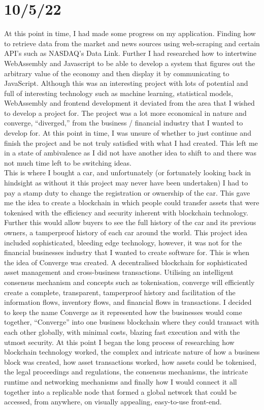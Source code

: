 \section{10/5/22}
At this point in time, I had made some progress on my application. Finding how to retrieve data from the market and news sources using web-scraping and certain API’s such as NASDAQ’s Data Link. Further I had researched how to intertwine WebAssembly and Javascript to be able to develop a system that figures out the arbitrary value of the economy and then display it by communicating to JavaScript. Although this was an interesting project with lots of potential and full of interesting technology such as machine learning, statistical models, WebAssembly and frontend development it deviated from the area that I wished to develop a project for. The project was a lot more economical in nature and converge, “diverged,” from the business / financial industry that I wanted to develop for. At this point in time, I was unsure of whether to just continue and finish the project and be not truly satisfied with what I had created. This left me in a state of ambivalence as I did not have another idea to shift to and there was not much time left to be switching ideas.  \\

This is where I bought a car, and unfortunately (or fortunately looking back in hindsight as without it this project may never have been undertaken) I had to pay a stamp duty to change the registration or ownership of the car. This gave me the idea to create a blockchain in which people could transfer assets that were tokenised with the efficiency and security inherent with blockchain technology. Further this would allow buyers to see the full history of the car and its previous owners, a tamperproof history of each car around the world. This project idea included sophisticated, bleeding edge technology, however, it was not for the financial businesses industry that I wanted to create software for. This is when the idea of Converge was created. A decentralised blockchain for sophisticated asset management and cross-business transactions. Utilising an intelligent consensus mechanism and concepts such as tokenisation, converge will efficiently create a complete, transparent, tamperproof history and facilitation of the information flows, inventory flows, and financial flows in transactions. I decided to keep the name Converge as it represented how the businesses would come together, “Converge” into one business blockchain where they could transact with each other globally, with minimal costs, blazing fast execution and with the utmost security. At this point I began the long process of researching how blockchain technology worked, the complex and intricate nature of how a business block was created, how asset transactions worked, how assets could be tokenised, the legal proceedings and regulations, the consensus mechanisms, the intricate runtime and networking mechanisms and finally how I would connect it all together into a replicable node that formed a global network that could be accessed, from anywhere, on visually appealing, easy-to-use front-end. \\
